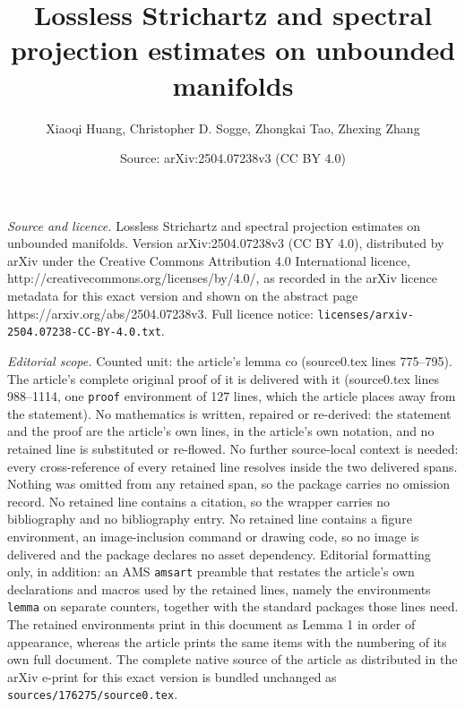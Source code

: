 \documentclass[10pt,a4paper]{amsart}
\title{Lossless Strichartz and spectral projection estimates on unbounded manifolds}
\author{Xiaoqi Huang, Christopher D. Sogge, Zhongkai Tao, Zhexing Zhang}
\date{Source: arXiv:2504.07238v3 (CC BY 4.0)}
\begin{document}
\maketitle

\noindent\emph{Source and licence.} Lossless Strichartz and spectral projection estimates on unbounded manifolds. Version arXiv:2504.07238v3 (CC BY 4.0), distributed by arXiv under the Creative Commons Attribution 4.0 International licence, http://creativecommons.org/licenses/by/4.0/, as recorded in the arXiv licence metadata for this exact version and shown on the abstract page https://arxiv.org/abs/2504.07238v3. Full licence notice: \texttt{licenses/arxiv-2504.07238-CC-BY-4.0.txt}.\par\smallskip

\noindent\textit{Editorial scope.} Counted unit: the article's lemma co (source0.tex lines 775--795). The article's complete original proof of it is delivered with it (source0.tex lines 988--1114, one \texttt{proof} environment of 127 lines, which the article places away from the statement). No mathematics is written, repaired or re-derived: the statement and the proof are the article's own lines, in the article's own notation, and no retained line is substituted or re-flowed.  No further source-local context is needed: every cross-reference of every retained line resolves inside the two delivered spans.  Nothing was omitted from any retained span, so the package carries no omission record.  No retained line contains a citation, so the wrapper carries no bibliography and no bibliography entry.  No retained line contains a figure environment, an image-inclusion command or drawing code, so no image is delivered and the package declares no asset dependency.  Editorial formatting only, in addition: an AMS \texttt{amsart} preamble that restates the article's own declarations and macros used by the retained lines, namely the environments \texttt{lemma} on separate counters, together with the standard packages those lines need.  The retained environments print in this document as Lemma 1 in order of appearance, whereas the article prints the same items with the numbering of its own full document.  The complete native source of the article as distributed in the arXiv e-print for this exact version is bundled unchanged as \texttt{sources/176275/source0.tex}.
\end{document}
